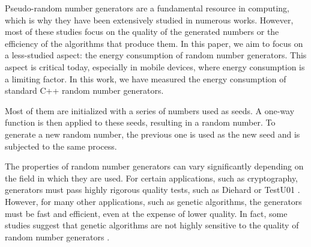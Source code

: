 \documentclass[sigconf]{acmart}
\begin{document}
Pseudo-random number generators \cite{marsaglia2003random} are a fundamental resource in computing, which is why they have been extensively studied in numerous works. However, most of these studies focus on the quality of the generated numbers or the efficiency of the algorithms that produce them. In this paper, we aim to focus on a less-studied aspect: the energy consumption of random number generators. This aspect is critical today, especially in mobile devices, where energy consumption is a limiting factor. In this work, we have measured the energy consumption of standard C++ random number generators.

Most of them are initialized with a series of numbers used as seeds. A one-way function is then applied to these seeds, resulting in a random number. To generate a new random number, the previous one is used as the new seed and is subjected to the same process.

The properties of random number generators can vary significantly depending on the field in which they are used. For certain applications, such as cryptography, generators must pass highly rigorous quality tests, such as Diehard \cite{marsaglia1997diehard} or TestU01 \cite{testu01}. However, for many other applications, such as genetic algorithms, the generators must be fast and efficient, even at the expense of lower quality. In fact, some studies suggest that genetic algorithms are not highly sensitive to the quality of random number generators \cite{cardenas2011sensitiveness}.
\end{document}
